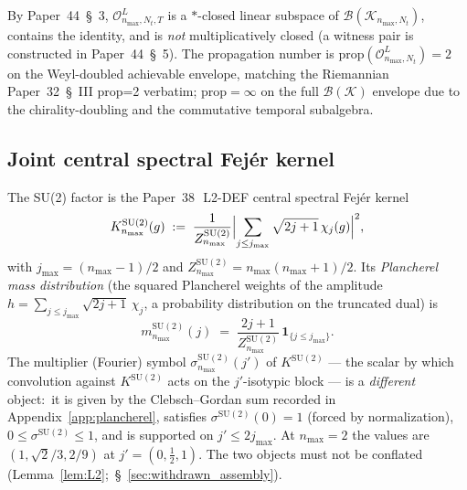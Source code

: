 \documentclass[11pt,a4paper]{article}
\theoremstyle{plain}
\theoremstyle{definition}
\newcommand{\nmax}{n_{\max}}
\newcommand{\Nt}{N_{t}}
\newcommand{\Krein}{\mathcal{K}}
\newcommand{\Op}{\mathcal{O}}
\newcommand{\Bcal}{\mathcal{B}}
\newcommand{\SU}{\mathrm{SU}}
\newcommand{\KSU}{K^{\SU(2)}}
\newcommand{\prop}{\mathrm{prop}}
\begin{document}
By Paper~44~\S~3, $\Op^{L}_{\nmax,\Nt,T}$ is a $\ast$-closed linear
subspace of $\Bcal(\Krein_{\nmax,\Nt})$, contains the identity, and
is \emph{not} multiplicatively closed (a witness pair is constructed
in Paper~44~\S~5). The propagation number is
$\prop(\Op^{L}_{\nmax,\Nt}) = 2$ on the Weyl-doubled achievable
envelope, matching the Riemannian Paper~32~\S~III prop=2 verbatim;
$\prop = \infty$ on the full $\Bcal(\Krein)$ envelope due to the
chirality-doubling and the commutative temporal subalgebra.

\subsection{Joint central spectral Fej\'er kernel}\label{sec:joint_fejer}

The SU(2) factor is the Paper~38~\cite{paper38}\,L2-DEF central
spectral Fej\'er kernel
\begin{equation}\label{eq:K_SU2_def}
   \KSU_{\nmax}(g) \;:=\; \frac{1}{Z^{\SU(2)}_{\nmax}}
   \Bigl|\sum_{j \le j_{\max}}
      \sqrt{2j+1}\,\chi_{j}(g)\Bigr|^{2},
\end{equation}
with $j_{\max} = (\nmax-1)/2$ and
$Z^{\SU(2)}_{\nmax} = \nmax(\nmax+1)/2$. Its \emph{Plancherel mass
distribution} (the squared Plancherel weights of the amplitude
$h = \sum_{j \le j_{\max}}\sqrt{2j+1}\,\chi_{j}$, a probability
distribution on the truncated dual) is
\begin{equation}\label{eq:K_SU2_plancherel}
   m^{\SU(2)}_{\nmax}(j) \;=\;
   \frac{2j + 1}{Z^{\SU(2)}_{\nmax}}\,\mathbf{1}_{\{j \le j_{\max}\}}.
\end{equation}
The multiplier (Fourier) symbol $\sigma^{\SU(2)}_{\nmax}(j')$ of
$\KSU$ — the scalar by which convolution against $\KSU$ acts on the
$j'$-isotypic block — is a \emph{different} object:\ it is given by
the Clebsch--Gordan sum recorded in Appendix~\ref{app:plancherel},
satisfies $\sigma^{\SU(2)}(0) = 1$ (forced by normalization),
$0 \le \sigma^{\SU(2)} \le 1$, and is supported on
$j' \le 2 j_{\max}$. At $\nmax = 2$ the values are
$(1, \sqrt2/3, 2/9)$ at $j' = (0, \tfrac12, 1)$. The two objects must
not be conflated (Lemma~\ref{lem:L2};\
\S~\ref{sec:withdrawn_assembly}).
\end{document}
